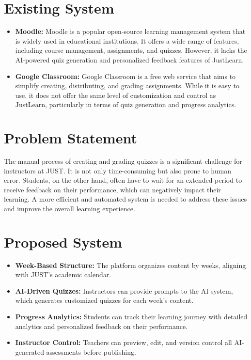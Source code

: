 \documentclass{thesis-library}
\begin{document}
\section{Existing System}
\begin{itemize}
\item \textbf{Moodle:} Moodle is a popular open-source learning management system that is widely used in educational institutions. It offers a wide range of features, including course management, assignments, and quizzes. However, it lacks the AI-powered quiz generation and personalized feedback features of JustLearn.
\item \textbf{Google Classroom:} Google Classroom is a free web service that aims to simplify creating, distributing, and grading assignments. While it is easy to use, it does not offer the same level of customization and control as JustLearn, particularly in terms of quiz generation and progress analytics.
\end{itemize}

\section{Problem Statement}
The manual process of creating and grading quizzes is a significant challenge for instructors at JUST. It is not only time-consuming but also prone to human error. Students, on the other hand, often have to wait for an extended period to receive feedback on their performance, which can negatively impact their learning. A more efficient and automated system is needed to address these issues and improve the overall learning experience.

\section{Proposed System}
\begin{itemize}
\item \textbf{Week-Based Structure:} The platform organizes content by weeks, aligning with JUST's academic calendar.
\item \textbf{AI-Driven Quizzes:} Instructors can provide prompts to the AI system, which generates customized quizzes for each week's content.
\item \textbf{Progress Analytics:} Students can track their learning journey with detailed analytics and personalized feedback on their performance.
\item \textbf{Instructor Control:} Teachers can preview, edit, and version control all AI-generated assessments before publishing.
\end{itemize}
\end{document}
